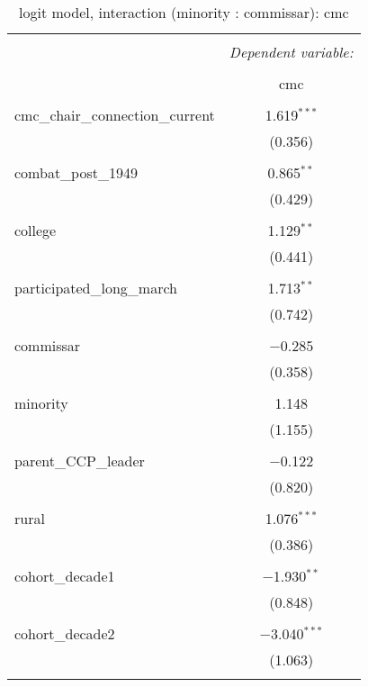 \documentclass[12pt,letterpaper]{article}
\begin{document}
\begin{table}[!htbp] \centering 
	\caption{logit model, interaction (minority : commissar): cmc} 
	\label{} 
	\rmfamily
	\scriptsize
	\begin{tabular}{@{\extracolsep{5pt}}lc} 
		\\[-1.8ex]\hline 
		\hline \\[-1.8ex] 
		& \multicolumn{1}{c}{\textit{Dependent variable:}} \\ 
		\cline{2-2} 
		\\[-1.8ex] & cmc \\ 
		\hline \\[-1.8ex] 
		cmc\_chair\_connection\_current & 1.619$^{***}$ \\ 
		& (0.356) \\ 
		& \\ 
		combat\_post\_1949 & 0.865$^{**}$ \\ 
		& (0.429) \\ 
		& \\ 
		college & 1.129$^{**}$ \\ 
		& (0.441) \\ 
		& \\ 
		participated\_long\_march & 1.713$^{**}$ \\ 
		& (0.742) \\ 
		& \\ 
		commissar & $-$0.285 \\ 
		& (0.358) \\ 
		& \\ 
		minority & 1.148 \\ 
		& (1.155) \\ 
		& \\ 
		parent\_CCP\_leader & $-$0.122 \\ 
		& (0.820) \\ 
		& \\ 
		rural & 1.076$^{***}$ \\ 
		& (0.386) \\ 
		& \\ 
		cohort\_decade1 & $-$1.930$^{**}$ \\ 
		& (0.848) \\ 
		& \\ 
		cohort\_decade2 & $-$3.040$^{***}$ \\ 
		& (1.063) \\ 
		& \\ 

\end{tabular}
\end{table}
\end{document}
